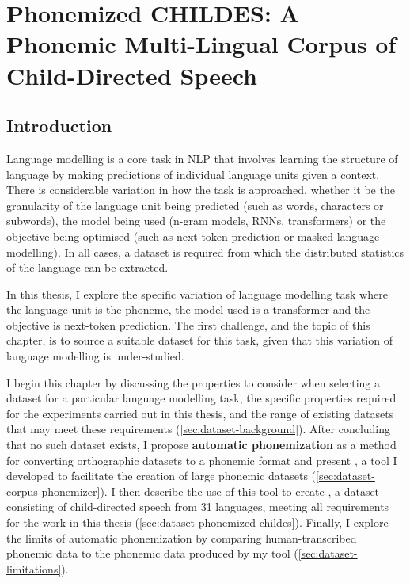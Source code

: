 \chapter{Phonemized CHILDES: A Phonemic Multi-Lingual Corpus of Child-Directed Speech}


\section{Introduction}
\label{sec:dataset-intro}

Language modelling is a core task in NLP that involves learning the structure of language by making predictions of individual language units given a context. There is considerable variation in how the task is approached, whether it be the granularity of the language unit being predicted (such as words, characters or subwords), the model being used (n-gram models, RNNs, transformers) or the objective being optimised (such as next-token prediction or masked language modelling). In all cases, a dataset is required from which the distributed statistics of the language can be extracted.

In this thesis, I explore the specific variation of language modelling task where the language unit is the phoneme, the model used is a transformer and the objective is next-token prediction. The first challenge, and the topic of this chapter, is to source a suitable dataset for this task, given that this variation of language modelling is under-studied.


I begin this chapter by discussing the properties to consider when selecting a dataset for a particular language modelling task, the specific properties required for the experiments carried out in this thesis, and the range of existing datasets that may meet these requirements (\cref{sec:dataset-background}). After concluding that no such dataset exists, I propose \textbf{automatic phonemization} as a method for converting orthographic datasets to a phonemic format and present \corpusphonemizer, a tool I developed to facilitate the creation of large phonemic datasets (\cref{sec:dataset-corpus-phonemizer}). I then describe the use of this tool to create \phonemizedchildes, a dataset consisting of child-directed speech from 31 languages, meeting all requirements for the work in this thesis (\cref{sec:dataset-phonemized-childes}). Finally, I explore the limits of automatic phonemization by comparing human-transcribed phonemic data to the phonemic data produced by my tool (\cref{sec:dataset-limitations}).

